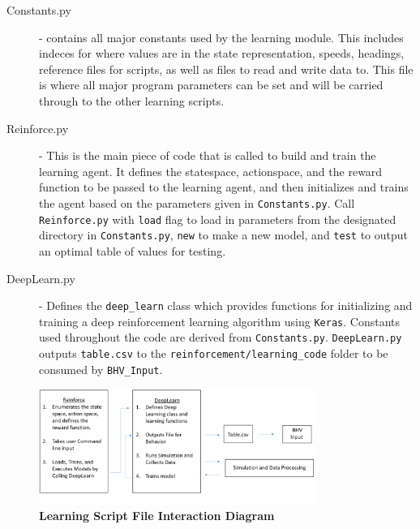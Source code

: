 \documentclass[onecolumn,letterpaper,11pt]{article}
\begin{document}
\begin{description}
	\item [Constants.py] - contains all major constants used by the learning module. This includes indeces for where values are in the state representation, speeds, headings, reference files for scripts, as well as files to read and write data to. This file is where all major program parameters can be set and will be carried through to the other learning scripts. 
	
	\item [Reinforce.py] - This is the main piece of code that is called to build and train the learning agent. It defines the statespace, actionspace, and the reward function to be passed to the learning agent, and then initializes and trains the agent based on the parameters given in \texttt{Constants.py}. Call \texttt{Reinforce.py} with \texttt{load} flag to load in parameters from the designated directory in \texttt{Constants.py}, \texttt{new} to make a new model, and \texttt{test} to output an optimal table of values for testing.
	
	\item [DeepLearn.py] - Defines the \texttt{deep\_learn} class which provides functions for initializing and training a deep reinforcement learning algorithm using \texttt{Keras}. Constants used throughout the code are derived from \texttt{Constants.py}. \texttt{DeepLearn.py} outputs \texttt{table.csv} to the \texttt{reinforcement/learning\_code} folder to be consumed by \texttt{BHV\_Input}.
\end{description}

\begin{figure}[H]
	\centering 
	\includegraphics[width=0.8\textwidth]{../images/LearningInteractionDiagram.png}
	\caption{{\bf Learning Script File Interaction Diagram} }
	\label{fig_learn_diagram}
\end{figure}
\end{document}
